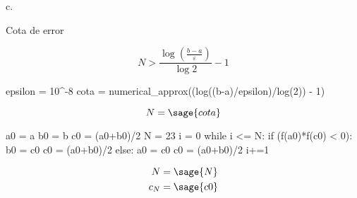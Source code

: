 \documentclass{amsart}
\begin{document}
	c.
	
	Cota de error
	
	$$
		N > \frac{\log (\frac{b-a}{\varepsilon})}{\log 2} - 1
	$$
	
	\begin{sageblock}
		epsilon = 10^-8
		cota = numerical_approx((log((b-a)/epsilon)/log(2)) - 1)
	\end{sageblock}

	$$ N = \sage{cota} $$
	
	\begin{pycode}
a0 = a
b0 = b
c0 = (a0+b0)/2
N = 23
i = 0
while i <= N:
	if (f(a0)*f(c0) < 0):
		b0 = c0
		c0 = (a0+b0)/2
	else:
		a0 = c0
		c0 = (a0+b0)/2
	i+=1
	\end{pycode}

	\begin{align*}
		N &= \sage{N} \\
		c_N &= \sage{c0} \\
	\end{align*}
	
\end{document}
